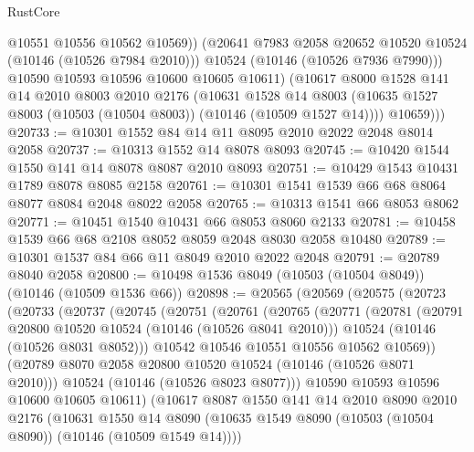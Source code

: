 \begin{lexlean}{RustCore}
\begin{coremodule}
                @10551
                @10556
                @10562
                @10569))
            (@20641 @7983 @2058 @20652 @10520 @10524 (@10146 (@10526 @7984 @2010)))
            @10524
            (@10146 (@10526 @7936 @7990)))
          @10590
          @10593
          @10596
          @10600
          @10605
          @10611)
        (@10617
          @8000
          @1528
          @141
          @14
          @2010
          @8003
          @2010
          @2176
          (@10631
            @1528
            @14
            @8003
            (@10635 @1527 @8003 (@10503 (@10504 @8003)) (@10146 (@10509 @1527 @14))))
          @10659)))
@20733 := @10301 @1552 @84 @14 @11 @8095 @2010 @2022 @2048 @8014 @2058
@20737 := @10313 @1552 @14 @8078 @8093
@20745 := @10420 @1544 @1550 @141 @14 @8078 @8087 @2010 @8093
@20751 := @10429 @1543 @10431 @1789 @8078 @8085 @2158
@20761 := @10301 @1541 @1539 @66 @68 @8064 @8077 @8084 @2048 @8022 @2058
@20765 := @10313 @1541 @66 @8053 @8062
@20771 := @10451 @1540 @10431 @66 @8053 @8060 @2133
@20781 := @10458 @1539 @66 @68 @2108 @8052 @8059 @2048 @8030 @2058 @10480
@20789 := @10301 @1537 @84 @66 @11 @8049 @2010 @2022 @2048
@20791 := @20789 @8040 @2058
@20800 := @10498 @1536 @8049 (@10503 (@10504 @8049)) (@10146 (@10509 @1536 @66))
@20898 := @20565
    (@20569
      (@20575
        (@20723
          (@20733
            (@20737
              (@20745
                (@20751
                  (@20761
                    (@20765
                      (@20771
                        (@20781
                          (@20791 @20800 @10520 @10524 (@10146 (@10526 @8041 @2010)))
                          @10524
                          (@10146 (@10526 @8031 @8052)))
                        @10542
                        @10546
                        @10551
                        @10556
                        @10562
                        @10569))
                    (@20789 @8070 @2058 @20800 @10520 @10524 (@10146 (@10526 @8071 @2010)))
                    @10524
                    (@10146 (@10526 @8023 @8077)))
                  @10590
                  @10593
                  @10596
                  @10600
                  @10605
                  @10611)
                (@10617
                  @8087
                  @1550
                  @141
                  @14
                  @2010
                  @8090
                  @2010
                  @2176
                  (@10631
                    @1550
                    @14
                    @8090
                    (@10635 @1549 @8090 (@10503 (@10504 @8090)) (@10146 (@10509 @1549 @14))))

\end{coremodule}
\end{lexlean}
